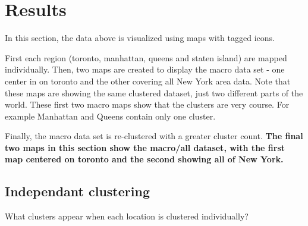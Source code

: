 \documentclass[11pt]{article}
\begin{document}
    

    \section{Results}\label{results}

In this section, the data above is visualized using maps with tagged
icons.

First each region (toronto, manhattan, queens and staten island) are
mapped individually. Then, two maps are created to display the macro
data set - one center in on toronto and the other covering all New York
area data. Note that these maps are showing the same clustered dataset,
just two different parts of the world. These first two macro maps show
that the clusters are very course. For example Manhattan and Queens
contain only one cluster.

Finally, the macro data set is re-clustered with a greater cluster
count. \textbf{The final two maps in this section show the macro/all
dataset, with the first map centered on toronto and the second showing
all of New York.}

    \subsection{Independant clustering}\label{independant-clustering}

What clusters appear when each location is clustered individually?
\end{document}
